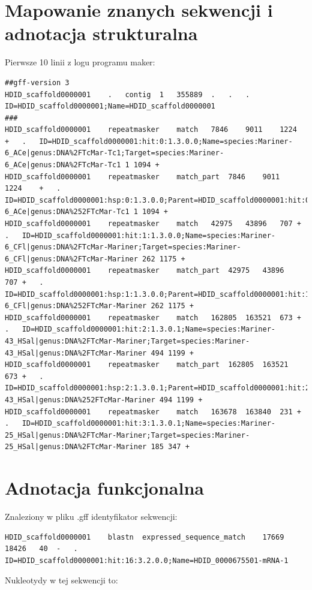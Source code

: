 \documentclass[a4paper]{article}
\begin{document}
\section{Mapowanie znanych sekwencji i adnotacja strukturalna}
Pierwsze 10 linii z logu programu maker:
\begin{lstlisting}
##gff-version 3
HDID_scaffold0000001	.	contig	1	355889	.	.	.	ID=HDID_scaffold0000001;Name=HDID_scaffold0000001
###
HDID_scaffold0000001	repeatmasker	match	7846	9011	1224	+	.	ID=HDID_scaffold0000001:hit:0:1.3.0.0;Name=species:Mariner-6_ACe|genus:DNA%2FTcMar-Tc1;Target=species:Mariner-6_ACe|genus:DNA%2FTcMar-Tc1 1 1094 +
HDID_scaffold0000001	repeatmasker	match_part	7846	9011	1224	+	.	ID=HDID_scaffold0000001:hsp:0:1.3.0.0;Parent=HDID_scaffold0000001:hit:0:1.3.0.0;Target=species:Mariner-6_ACe|genus:DNA%252FTcMar-Tc1 1 1094 +
HDID_scaffold0000001	repeatmasker	match	42975	43896	707	+	.	ID=HDID_scaffold0000001:hit:1:1.3.0.0;Name=species:Mariner-6_CFl|genus:DNA%2FTcMar-Mariner;Target=species:Mariner-6_CFl|genus:DNA%2FTcMar-Mariner 262 1175 +
HDID_scaffold0000001	repeatmasker	match_part	42975	43896	707	+	.	ID=HDID_scaffold0000001:hsp:1:1.3.0.0;Parent=HDID_scaffold0000001:hit:1:1.3.0.0;Target=species:Mariner-6_CFl|genus:DNA%252FTcMar-Mariner 262 1175 +
HDID_scaffold0000001	repeatmasker	match	162805	163521	673	+	.	ID=HDID_scaffold0000001:hit:2:1.3.0.1;Name=species:Mariner-43_HSal|genus:DNA%2FTcMar-Mariner;Target=species:Mariner-43_HSal|genus:DNA%2FTcMar-Mariner 494 1199 +
HDID_scaffold0000001	repeatmasker	match_part	162805	163521	673	+	.	ID=HDID_scaffold0000001:hsp:2:1.3.0.1;Parent=HDID_scaffold0000001:hit:2:1.3.0.1;Target=species:Mariner-43_HSal|genus:DNA%252FTcMar-Mariner 494 1199 +
HDID_scaffold0000001	repeatmasker	match	163678	163840	231	+	.	ID=HDID_scaffold0000001:hit:3:1.3.0.1;Name=species:Mariner-25_HSal|genus:DNA%2FTcMar-Mariner;Target=species:Mariner-25_HSal|genus:DNA%2FTcMar-Mariner 185 347 +
\end{lstlisting}

\section{Adnotacja funkcjonalna}
Znaleziony w pliku .gff identyfikator sekwencji:
\begin{lstlisting}
HDID_scaffold0000001	blastn	expressed_sequence_match	17669	18426	40	-	.	ID=HDID_scaffold0000001:hit:16:3.2.0.0;Name=HDID_0000675501-mRNA-1
\end{lstlisting}

Nukleotydy w tej sekwencji to:
\end{document}
